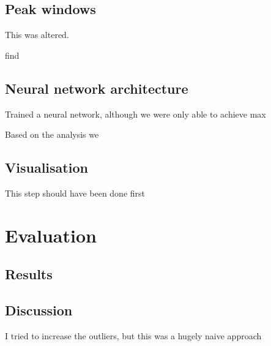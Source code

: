 
\section{Peak windows}
This was altered.

find





\section{Neural network architecture}
Trained a neural network, although we were only able to achieve max

Based on the analysis we

\section{Visualisation}
This step should have been done first

\chapter{Evaluation}

\section{Results}


\section{Discussion}
I tried to increase the outliers, but this was a hugely naive approach


